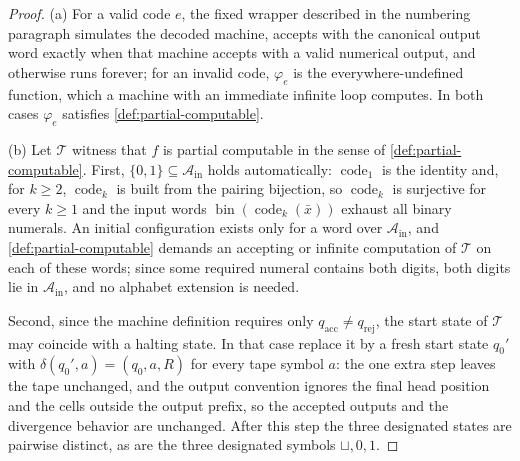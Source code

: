 \begin{proof}
(a) For a valid code \(e\), the fixed wrapper described in the numbering
paragraph simulates the decoded machine, accepts with the canonical output
word exactly when that machine accepts with a valid numerical output, and
otherwise runs forever; for an invalid code, \(\varphi_e\) is the
everywhere-undefined function, which a machine with an immediate infinite
loop computes.  In both cases \(\varphi_e\) satisfies
\cref{def:partial-computable}.

(b) Let \(\mathcal T\) witness that \(f\) is partial computable in the sense
of \cref{def:partial-computable}.  First,
\(\{0,1\}\subseteq\mathcal A_{\mathrm{in}}\) holds automatically:
\(\operatorname{code}_1\) is the identity and, for \(k\geq2\),
\(\operatorname{code}_k\) is built from the pairing bijection, so
\(\operatorname{code}_k\) is surjective for every \(k\geq1\) and the input
words \(\operatorname{bin}(\operatorname{code}_k(\bar x))\) exhaust all
binary numerals.  An initial configuration exists only for a word over
\(\mathcal A_{\mathrm{in}}\), and \cref{def:partial-computable} demands an
accepting or infinite computation of \(\mathcal T\) on each of these words;
since some required numeral contains both digits, both digits lie in
\(\mathcal A_{\mathrm{in}}\), and no alphabet extension is needed.

Second, since the machine definition requires only
\(q_{\mathrm{acc}}\neq q_{\mathrm{rej}}\), the start state of
\(\mathcal T\) may coincide with a halting state.  In that case replace it
by a fresh start state \(q_0'\) with \(\delta(q_0',a)=(q_0,a,R)\) for every
tape symbol \(a\): the one extra step leaves the tape unchanged, and the
output convention ignores the final head position and the cells outside the
output prefix, so the accepted outputs and the divergence behavior are
unchanged.  After this step the three designated states are pairwise
distinct, as are the three designated symbols \(\sqcup,0,1\).


\end{proof}
